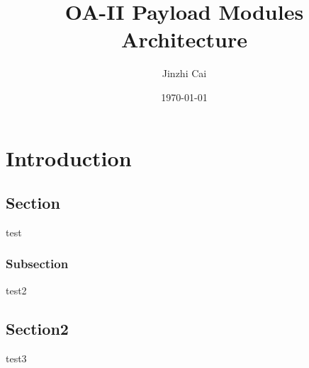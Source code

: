 \documentclass[12pt,article]{memoir}
\title{OA-II Payload Modules Architecture}
\author{Jinzhi Cai}
\date{\today}
\begin{document}
	


\tableofcontents*
\clearpage


\chapter{Introduction}
\section{Section}
test
\subsection{Subsection}
test2
\section{Section2}
test3


\end{document}
